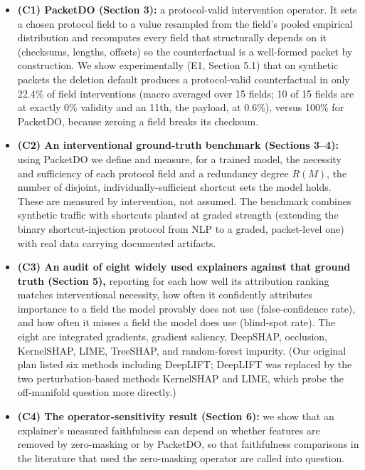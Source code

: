 \documentclass[journal]{IEEEtran}
\begin{document}
\begin{itemize}
\item
  \textbf{(C1) PacketDO (Section 3):} a protocol-valid intervention
  operator. It sets a chosen protocol field to a value resampled from
  the field's pooled empirical distribution and recomputes every field
  that structurally depends on it (checksums, lengths, offsets) so the
  counterfactual is a well-formed packet by construction. We show
  experimentally (E1, Section 5.1) that on synthetic packets the
  deletion default produces a protocol-valid counterfactual in only
  22.4\% of field interventions (macro averaged over 15 fields; 10 of 15
  fields are at exactly 0\% validity and an 11th, the payload, at
  0.6\%), versus 100\% for PacketDO, because zeroing a field breaks its
  checksum.
\item
  \textbf{(C2) An interventional ground-truth benchmark (Sections
  3--4):} using PacketDO we define and measure, for a trained model, the
  necessity and sufficiency of each protocol field and a redundancy
  degree $R(M)$, the number of disjoint, individually-sufficient shortcut
  sets the model holds. These are measured by intervention, not assumed.
  The benchmark combines synthetic traffic with shortcuts planted at
  graded strength (extending the binary shortcut-injection protocol from
  NLP \cite{bastings2022shortcuts} to a graded, packet-level one) with
  real data carrying documented artifacts.
\item
  \textbf{(C3) An audit of eight widely used explainers against that
  ground truth (Section 5),} reporting for each how well its attribution
  ranking matches interventional necessity, how often it confidently
  attributes importance to a field the model provably does not use
  (false-confidence rate), and how often it misses a field the model
  does use (blind-spot rate). The eight are integrated gradients,
  gradient saliency, DeepSHAP, occlusion, KernelSHAP, LIME, TreeSHAP,
  and random-forest impurity. (Our original plan listed six methods
  including DeepLIFT; DeepLIFT was replaced by the two
  perturbation-based methods KernelSHAP and LIME, which probe the
  off-manifold question more directly.)
\item
  \textbf{(C4) The operator-sensitivity result (Section 6):} we show
  that an explainer's measured faithfulness can depend on whether
  features are removed by zero-masking or by PacketDO, so that
  faithfulness comparisons in the literature that used the zero-masking
  operator are called into question.
\end{itemize}
\end{document}
